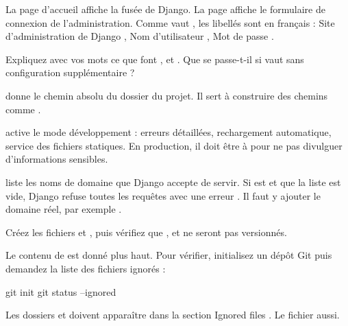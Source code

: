 \begin{correction}
La page d'accueil affiche la fusée de Django. La page  affiche le
formulaire de connexion de l'administration. Comme  vaut
, les libellés sont en français : \og Site d'administration de Django
\fg, \og Nom d'utilisateur \fg, \og Mot de passe \fg.
\end{correction}

\begin{exercice}
Expliquez avec vos mots ce que font ,  et
. Que se passe-t-il si  vaut  sans
configuration supplémentaire ?
\end{exercice}

\begin{correction}
 donne le chemin absolu du dossier du projet. Il sert à construire
des chemins comme .

 active le mode développement : erreurs détaillées, rechargement
automatique, service des fichiers statiques. En production, il doit être à
 pour ne pas divulguer d'informations sensibles.

 liste les noms de domaine que Django accepte de servir. Si
 est  et que la liste est vide, Django refuse toutes les
requêtes avec une erreur . Il faut y ajouter le domaine réel,
par exemple .
\end{correction}

\begin{exercice}
Créez les fichiers  et , puis vérifiez que
,  et  ne seront pas
versionnés.
\end{exercice}

\begin{correction}
Le contenu de  est donné plus haut. Pour vérifier, initialisez un
dépôt Git puis demandez la liste des fichiers ignorés :

\begin{terminal}
git init
git status --ignored
\end{terminal}

Les dossiers  et  doivent apparaître dans la
section \og Ignored files \fg. Le fichier  aussi.
\end{correction}


